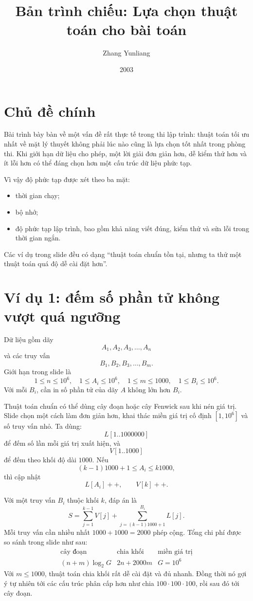 \documentclass[11pt]{article}
\title{Bản trình chiếu: Lựa chọn thuật toán cho bài toán}
\author{Zhang Yunliang}
\date{2003}
\begin{document}
\maketitle


\section{Chủ đề chính}

Bài trình bày bàn về một vấn đề rất thực tế trong thi lập trình: thuật toán
tối ưu nhất về mặt lý thuyết không phải lúc nào cũng là lựa chọn tốt nhất
trong phòng thi. Khi giới hạn dữ liệu cho phép, một lời giải đơn giản hơn,
dễ kiểm thử hơn và ít lỗi hơn có thể đáng chọn hơn một cấu trúc dữ liệu phức
tạp.

Vì vậy độ phức tạp được xét theo ba mặt:
\begin{itemize}
  \item thời gian chạy;
  \item bộ nhớ;
  \item độ phức tạp lập trình, bao gồm khả năng viết đúng, kiểm thử và sửa
        lỗi trong thời gian ngắn.
\end{itemize}
Các ví dụ trong slide đều có dạng ``thuật toán chuẩn tồn tại, nhưng ta thử
một thuật toán quá độ dễ cài đặt hơn''.

\section{Ví dụ 1: đếm số phần tử không vượt quá ngưỡng}

Dữ liệu gồm dãy
\[
  A_1,A_2,A_3,\ldots,A_n
\]
và các truy vấn
\[
  B_1,B_2,B_3,\ldots,B_m.
\]
Giới hạn trong slide là
\[
  1\le n\le10^6,\quad 1\le A_i\le10^6,\quad
  1\le m\le1000,\quad 1\le B_i\le10^6.
\]
Với mỗi \(B_i\), cần in số phần tử của dãy \(A\) không lớn hơn \(B_i\).

Thuật toán chuẩn có thể dùng cây đoạn hoặc cây Fenwick sau khi nén giá trị.
Slide chọn một cách làm đơn giản hơn, khai thác miền giá trị cố định
\([1,10^6]\) và số truy vấn nhỏ. Ta dùng:
\[
  L[1..1000000]
\]
để đếm số lần mỗi giá trị xuất hiện, và
\[
  V[1..1000]
\]
để đếm theo khối độ dài \(1000\). Nếu
\[
  (k-1)1000+1\le A_i\le k1000,
\]
thì cập nhật
\[
  L[A_i]++,\qquad V[k]++.
\]

Với một truy vấn \(B_i\) thuộc khối \(k\), đáp án là
\[
  S=\sum_{j=1}^{k-1}V[j]
    +\sum_{j=(k-1)1000+1}^{B_i}L[j].
\]
Mỗi truy vấn cần nhiều nhất \(1000+1000=2000\) phép cộng. Tổng chi phí được so
sánh trong slide như sau:
\[
\begin{array}{c|c|c}
  \text{cây đoạn} & \text{chia khối} & \text{miền giá trị}\\ \hline
  (n+m)\log_2 G & 2n+2000m & G=10^6
\end{array}
\]
Với \(m\le1000\), thuật toán chia khối rất dễ cài đặt và đủ nhanh. Đồng thời
nó gợi ý tự nhiên tới các cấu trúc phân cấp hơn như chia \(100\cdot100\cdot
100\), rồi sau đó tới cây đoạn.
\end{document}
